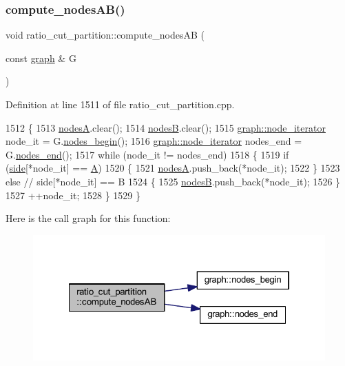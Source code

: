 \subsubsection{\texorpdfstring{compute\+\_\+nodes\+A\+B()}{compute\_nodesAB()}}
{\footnotesize\ttfamily void ratio\+\_\+cut\+\_\+partition\+::compute\+\_\+nodes\+AB (\begin{DoxyParamCaption}\item[{const \mbox{\hyperlink{classgraph}{graph}} \&}]{G }\end{DoxyParamCaption})\hspace{0.3cm}{\ttfamily [protected]}}



Definition at line 1511 of file ratio\+\_\+cut\+\_\+partition.\+cpp.


\begin{DoxyCode}
1512 \{
1513     \mbox{\hyperlink{classratio__cut__partition_a871cc6bf77000205fec8ab6d3a28fc28}{nodesA}}.clear();
1514     \mbox{\hyperlink{classratio__cut__partition_af207198b35e52e4055487f8ae8c23d8d}{nodesB}}.clear();
1515     \mbox{\hyperlink{classgraph_a2cb374b84c133ce13f94e73c3e5da7fa}{graph::node\_iterator}} node\_it = G.\mbox{\hyperlink{classgraph_aec053a4b509d1be804237a80044c54c0}{nodes\_begin}}();
1516     \mbox{\hyperlink{classgraph_a2cb374b84c133ce13f94e73c3e5da7fa}{graph::node\_iterator}} nodes\_end = G.\mbox{\hyperlink{classgraph_abbf9c0cb5629e98e1142254911238173}{nodes\_end}}();
1517     \textcolor{keywordflow}{while} (node\_it != nodes\_end)
1518     \{
1519     \textcolor{keywordflow}{if} (\mbox{\hyperlink{classratio__cut__partition_a2bf913d1d8607747885177a3b585e611}{side}}[*node\_it] == \mbox{\hyperlink{classratio__cut__partition_a9c0da5ad845b01bddbc1f238fa35cdd0}{A}})
1520     \{
1521         \mbox{\hyperlink{classratio__cut__partition_a871cc6bf77000205fec8ab6d3a28fc28}{nodesA}}.push\_back(*node\_it);
1522     \}
1523     \textcolor{keywordflow}{else}    \textcolor{comment}{// side[*node\_it] == B}
1524     \{
1525         \mbox{\hyperlink{classratio__cut__partition_af207198b35e52e4055487f8ae8c23d8d}{nodesB}}.push\_back(*node\_it);
1526     \}
1527     ++node\_it;
1528     \}
1529 \}
\end{DoxyCode}
Here is the call graph for this function\+:\nopagebreak
\begin{figure}[H]
\begin{center}
\leavevmode
\includegraphics[width=322pt]{classratio__cut__partition_a39341e2459485a3f5367081ff208e769_cgraph}
\end{center}
\end{figure}
